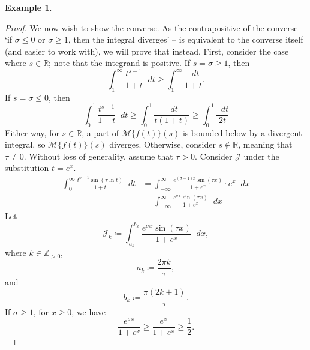 \documentclass[a4paper]{article}
\newcommand*\diff{\mathop{}\!d} %
\newcommand{\R}{\mathbb{R}}
\newcommand{\Z}{\mathbb{Z}}
\theoremstyle{definition}
\newtheorem{example}[theorem]{Example}
\begin{document}
\begin{example}
\begin{proof}
        We now wish to show the converse.
        As the contrapositive of the converse -- `if $\sigma \leq 0$ or $\sigma \geq 1$, then the integral diverges' -- is equivalent to the converse itself (and easier to work with), we will prove that instead.
        First, consider the case where $s \in \R$; note that the integrand is positive.
        If $s = \sigma \geq 1$, then
        \begin{equation*}
            \int_1^\infty \frac{t^{s-1}}{1+t} \diff t \geq \int_1^\infty \frac{\diff t}{1+t}.
        \end{equation*}
        If $s = \sigma \leq 0$, then
        \begin{equation*}
            \int_0^1 \frac{t^{s-1}}{1+t} \diff t \geq \int_0^1 \frac{\diff t}{t(1+t)} \geq \int_0^1 \frac{\diff t}{2t}
        \end{equation*}
        Either way, for $s \in \R$, a part of $\mathcal{M}\{f(t)\}(s)$ is bounded below by a divergent integral, so $\mathcal{M}\{f(t)\}(s)$ diverges.
        Otherwise, consider $s \notin \R$, meaning that $\tau \neq 0$.
        Without loss of generality, assume that $\tau > 0$.
        Consider $\mathcal{J}$ under the substitution $t = e^x$.
        \begin{align*}
            \int_0^\infty \frac{t^{\sigma-1} \sin(\tau \ln t)}{1+t} \diff t & = \int_{-\infty}^\infty \frac{e^{(\sigma-1)x}\sin(\tau x)}{1+e^x} \cdot e^x \diff x \\
                                                                            & = \int_{-\infty}^\infty \frac{e^{\sigma x}\sin(\tau x)}{1+e^x} \diff x
        \end{align*}
        Let
        \begin{equation*}
            \mathcal{J}_k \coloneq \int_{a_k}^{b_k} \frac{e^{\sigma x}\sin(\tau x)}{1+e^x} \diff x,
        \end{equation*}
        where $k \in \Z_{>0}$,
        \begin{equation*}
            a_k \coloneq \frac{2\pi k}{\tau},
        \end{equation*}
        and
        \begin{equation*}
            b_k \coloneq \frac{\pi(2k+1)}{\tau}.
        \end{equation*}
        If $\sigma \geq 1$, for $x \geq 0$, we have
        \begin{equation*}
            \frac{e^{\sigma x}}{1+e^x} \geq \frac{e^x}{1+e^x} \geq \frac{1}{2}.
        \end{equation*}

\end{proof}
\end{example}
\end{document}
